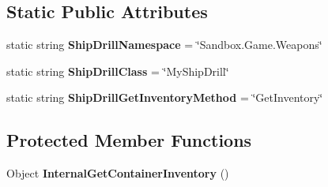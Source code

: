 \subsection*{Static Public Attributes}
\begin{DoxyCompactItemize}
\item 
\hypertarget{class_s_e_mod_a_p_i_internal_1_1_a_p_i_1_1_entity_1_1_sector_1_1_sector_object_1_1_cube_grid_1_1d51c0ecece4b059e03822a2f6c969595_ab7810a71b45b61a0ba2fc86e82b5d866}{}static string {\bfseries Ship\+Drill\+Namespace} = \char`\"{}Sandbox.\+Game.\+Weapons\char`\"{}\label{class_s_e_mod_a_p_i_internal_1_1_a_p_i_1_1_entity_1_1_sector_1_1_sector_object_1_1_cube_grid_1_1d51c0ecece4b059e03822a2f6c969595_ab7810a71b45b61a0ba2fc86e82b5d866}

\item 
\hypertarget{class_s_e_mod_a_p_i_internal_1_1_a_p_i_1_1_entity_1_1_sector_1_1_sector_object_1_1_cube_grid_1_1d51c0ecece4b059e03822a2f6c969595_a3e289b31082ba0d1019777de5cc1e844}{}static string {\bfseries Ship\+Drill\+Class} = \char`\"{}My\+Ship\+Drill\char`\"{}\label{class_s_e_mod_a_p_i_internal_1_1_a_p_i_1_1_entity_1_1_sector_1_1_sector_object_1_1_cube_grid_1_1d51c0ecece4b059e03822a2f6c969595_a3e289b31082ba0d1019777de5cc1e844}

\item 
\hypertarget{class_s_e_mod_a_p_i_internal_1_1_a_p_i_1_1_entity_1_1_sector_1_1_sector_object_1_1_cube_grid_1_1d51c0ecece4b059e03822a2f6c969595_aa4a6ed86231933fce1589a31ed5b0679}{}static string {\bfseries Ship\+Drill\+Get\+Inventory\+Method} = \char`\"{}Get\+Inventory\char`\"{}\label{class_s_e_mod_a_p_i_internal_1_1_a_p_i_1_1_entity_1_1_sector_1_1_sector_object_1_1_cube_grid_1_1d51c0ecece4b059e03822a2f6c969595_aa4a6ed86231933fce1589a31ed5b0679}

\end{DoxyCompactItemize}
\subsection*{Protected Member Functions}
\begin{DoxyCompactItemize}
\item 
\hypertarget{class_s_e_mod_a_p_i_internal_1_1_a_p_i_1_1_entity_1_1_sector_1_1_sector_object_1_1_cube_grid_1_1d51c0ecece4b059e03822a2f6c969595_ad39160b69b24fc26d21d4d472192114f}{}Object {\bfseries Internal\+Get\+Container\+Inventory} ()\label{class_s_e_mod_a_p_i_internal_1_1_a_p_i_1_1_entity_1_1_sector_1_1_sector_object_1_1_cube_grid_1_1d51c0ecece4b059e03822a2f6c969595_ad39160b69b24fc26d21d4d472192114f}

\end{DoxyCompactItemize}
